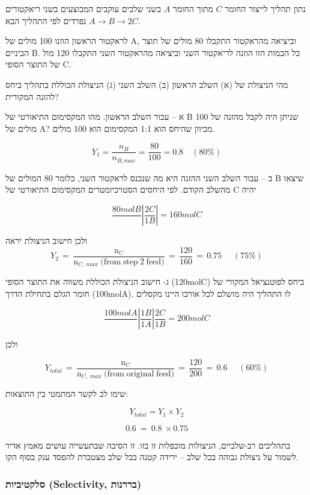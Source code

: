 \documentclass[
  hebrew,
  letterpaper,
  DIV=11,
  numbers=noendperiod]{scrreprt}
\begin{document}
נתון תהליך לייצור החומר \(C\) מתוך החומר \(A\) בשני שלבים עוקבים
המבוצעים בשני ריאקטורים נפרדים לפי התהליך הבא
\(A \rightarrow B \rightarrow 2C\).

לראקטור הראשון הוזנו 100 מולים של A, וביציאה מהראקטור התקבלו 80 מולים של
תוצר הביניים B. כל הכמות הזו הוזנה לריאקטור השני וביציאה מהראקטור השני
התקבלו 120 מול של התוצר הסופי C.

מהי הניצולת של (א) השלב הראשון (ב) השלב השני (ג) הניצולת הכוללת בתהליך
ביחס להזנה המקורית?

א -- עבור השלב הראשון. מהו המקסימום התיאורטי של B שניתן היה לקבל מהזנה
של 100 מולים של A? מכיוון שהיחס הוא 1:1 המקסימום הוא 100 מולים.

\[Y_{1} = \frac{n_{B}}{n_{B,mav}} = \frac{80}{100} = 0.8\quad(80\%)\]

ב -- עבור השלב השני ההזנה היא מה שנכנס לראקטור השני, כלומר 80 המולים של
B שיצאו מהשלב הקודם. לפי היחסים הסטויכיומטרים המקסימום התיאורטי של C
יהיה

\[\frac{80molB}{}\left| \frac{2C}{1B} \right| = 160molC\]

ולכן חישוב הניצולת יראה\\
\[Y_{2}\, = \,\frac{\text{n}_{C}}{\text{n}_{C,\ max}\text{ (from step 2 feed)}}\, = \,\frac{120}{160}\, = \, 0.75\,\quad\,(75\%)\]

ג- חישוב הניצולת הכוללת משווה את התוצר הסופי (120molC) ביחס לפוטנציאל
המקורי של חומר הגלם בתחילת הדרך (100molA). לו התהליך היה מושלם לכל אורכו
היינו מקסלים

\[\frac{100molA}{}\left| \frac{1B}{1A} \right|\frac{2C}{1B} = 200molC\]

ולכן

\[Y_{total}\, = \,\frac{\text{n}_{C}}{\text{n}_{C,\ max}\text{ (from original feed)}}\, = \,\frac{120}{200}\, = \, 0.6\,\quad\,(60\%)\]

שימו לב לקשר המתמטי בין התוצאות:

\[Y_{total} = Y_{1} \times Y_{2}\]

\[0.6\  = \ 0.8\  \times 0.75\]

בתהליכים רב-שלביים, הניצולות מוכפלות זו בזו. זו הסיבה שבתעשייה עושים
מאמץ אדיר לשמור על ניצולת גבוהה בכל שלב -- ירידה קטנה בכל שלב מצטברת
להפסד ענק בסוף הקו.

\subsubsection{סלקטיביות (Selectivity,
בררנות)}\label{ux5e1ux5dcux5e7ux5d8ux5d9ux5d1ux5d9ux5d5ux5ea-selectivity-ux5d1ux5e8ux5e8ux5e0ux5d5ux5ea}
\end{document}
